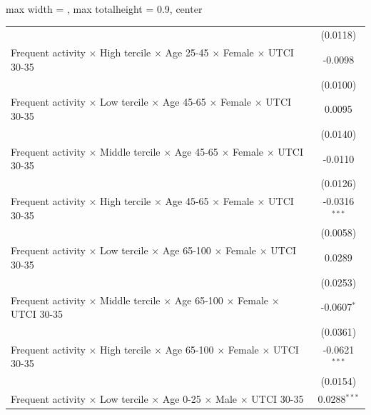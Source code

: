 \begin{table}[htbp]
\begin{adjustbox}{max width = \textwidth, max totalheight = 0.9\textheight, center}
\begin{tabular}{lc}
                                                                                                               & (0.0118)\\   
         Frequent activity $\times$ High tercile $\times$ Age 25-45 $\times$ Female $\times$ UTCI 30-35        & -0.0098\\   
                                                                                                               & (0.0100)\\   
         Frequent activity $\times$ Low tercile $\times$ Age 45-65 $\times$ Female $\times$ UTCI 30-35         & 0.0095\\   
                                                                                                               & (0.0140)\\   
         Frequent activity $\times$ Middle tercile $\times$ Age 45-65 $\times$ Female $\times$ UTCI 30-35      & -0.0110\\   
                                                                                                               & (0.0126)\\   
         Frequent activity $\times$ High tercile $\times$ Age 45-65 $\times$ Female $\times$ UTCI 30-35        & -0.0316$^{***}$\\   
                                                                                                               & (0.0058)\\   
         Frequent activity $\times$ Low tercile $\times$ Age 65-100 $\times$ Female $\times$ UTCI 30-35        & 0.0289\\   
                                                                                                               & (0.0253)\\   
         Frequent activity $\times$ Middle tercile $\times$ Age 65-100 $\times$ Female $\times$ UTCI 30-35     & -0.0607$^{*}$\\   
                                                                                                               & (0.0361)\\   
         Frequent activity $\times$ High tercile $\times$ Age 65-100 $\times$ Female $\times$ UTCI 30-35       & -0.0621$^{***}$\\   
                                                                                                               & (0.0154)\\   
         Frequent activity $\times$ Low tercile $\times$ Age 0-25 $\times$ Male $\times$ UTCI 30-35            & 0.0288$^{***}$\\   

\end{tabular}
\end{adjustbox}
\end{table}
